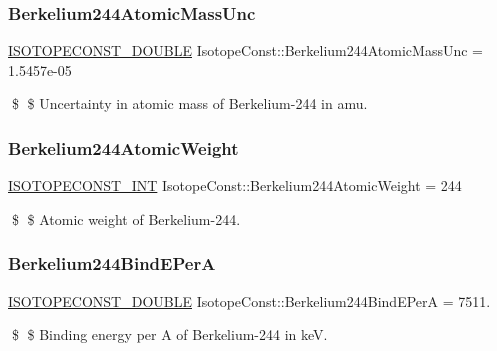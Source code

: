 \subsubsection{\texorpdfstring{Berkelium244\+Atomic\+Mass\+Unc}{Berkelium244AtomicMassUnc}}
{\footnotesize\ttfamily \mbox{\hyperlink{group___isotope_const-_macros_ga8f45a7272ce02c0b4c65c44636ed719a}{I\+S\+O\+T\+O\+P\+E\+C\+O\+N\+S\+T\+\_\+\+D\+O\+U\+B\+LE}} Isotope\+Const\+::\+Berkelium244\+Atomic\+Mass\+Unc = 1.\+5457e-\/05}

\$ \$ Uncertainty in atomic mass of Berkelium-\/244 in amu. \mbox{\label{group___isotope_const-_berkelium-_bk244_gabd61fc52a069939eaa02111d60f9ee47}} 
\subsubsection{\texorpdfstring{Berkelium244\+Atomic\+Weight}{Berkelium244AtomicWeight}}
{\footnotesize\ttfamily \mbox{\hyperlink{group___isotope_const-_macros_ga5f18360b3e99483a35c32d789e62621c}{I\+S\+O\+T\+O\+P\+E\+C\+O\+N\+S\+T\+\_\+\+I\+NT}} Isotope\+Const\+::\+Berkelium244\+Atomic\+Weight = 244}

\$ \$ Atomic weight of Berkelium-\/244. \mbox{\label{group___isotope_const-_berkelium-_bk244_ga549de29f7c68ef5fa4055f0106d64e1a}} 
\subsubsection{\texorpdfstring{Berkelium244\+Bind\+E\+PerA}{Berkelium244BindEPerA}}
{\footnotesize\ttfamily \mbox{\hyperlink{group___isotope_const-_macros_ga8f45a7272ce02c0b4c65c44636ed719a}{I\+S\+O\+T\+O\+P\+E\+C\+O\+N\+S\+T\+\_\+\+D\+O\+U\+B\+LE}} Isotope\+Const\+::\+Berkelium244\+Bind\+E\+PerA = 7511.}

\$ \$ Binding energy per A of Berkelium-\/244 in keV. \mbox{\label{group___isotope_const-_berkelium-_bk244_ga1959a1a9f1001929ac52e7039ee2b086}} 
